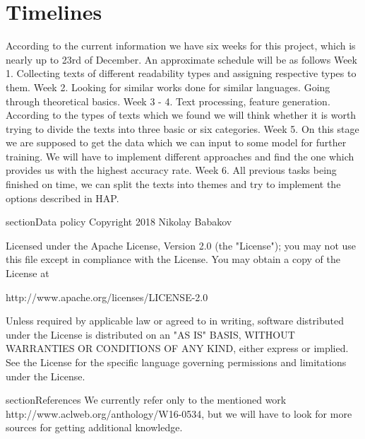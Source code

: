 \documentclass{article}
\begin{document}
\section{Timelines}
According to the current information we have six weeks for this project, which is nearly up to 23rd of December.
An approximate schedule will be as follows\newline
Week 1. Collecting texts of different readability types and assigning respective types to them.\newline
Week 2. Looking for similar works done for similar languages. Going through theoretical basics. \newline
Week 3 - 4. Text processing, feature generation. According to the types of texts which we found we will think whether it is worth trying to divide the texts into three basic or six categories.\newline
Week 5. On this stage we are supposed to get the data which we can input to some model for further training. We will have to implement different approaches and find the one which provides us with the highest accuracy rate.\newline
Week 6. All previous tasks being finished on time, we can split the texts into themes and try to implement the options described in HAP.

section{Data policy}
Copyright 2018 Nikolay Babakov

Licensed under the Apache License, Version 2.0 (the "License");
you may not use this file except in compliance with the License.
You may obtain a copy of the License at

http://www.apache.org/licenses/LICENSE-2.0

Unless required by applicable law or agreed to in writing, software
distributed under the License is distributed on an "AS IS" BASIS,
WITHOUT WARRANTIES OR CONDITIONS OF ANY KIND, either express or implied.
See the License for the specific language governing permissions and
limitations under the License. 

section{References}
We currently refer only to the mentioned work http://www.aclweb.org/anthology/W16-0534, but we will have to look for more sources for getting additional knowledge. 
\end{document}
